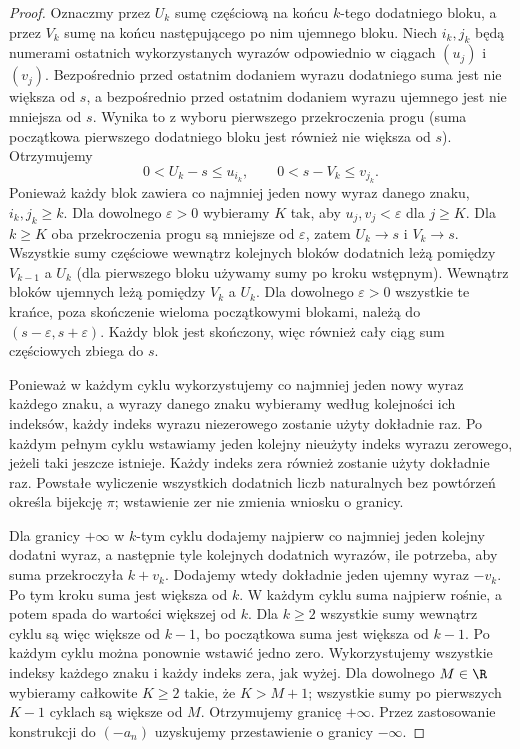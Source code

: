 \begin{proof}
Oznaczmy przez $U_k$ sumę częściową na końcu $k$-tego dodatniego bloku, a przez $V_k$ sumę na końcu następującego po nim ujemnego bloku. Niech $i_k,j_k$ będą numerami ostatnich wykorzystanych wyrazów odpowiednio w ciągach $(u_j)$ i $(v_j)$. Bezpośrednio przed ostatnim dodaniem wyrazu dodatniego suma jest nie większa od $s$, a bezpośrednio przed ostatnim dodaniem wyrazu ujemnego jest nie mniejsza od $s$. Wynika to z wyboru pierwszego przekroczenia progu (suma początkowa pierwszego dodatniego bloku jest również nie większa od $s$). Otrzymujemy
\[
 0<U_k-s\le u_{i_k},\qquad 0<s-V_k\le v_{j_k}.
\]
Ponieważ każdy blok zawiera co najmniej jeden nowy wyraz danego znaku, $i_k,j_k\ge k$. Dla dowolnego $\varepsilon>0$ wybieramy $K$ tak, aby $u_j,v_j<\varepsilon$ dla $j\ge K$. Dla $k\ge K$ oba przekroczenia progu są mniejsze od $\varepsilon$, zatem $U_k\to s$ i $V_k\to s$. Wszystkie sumy częściowe wewnątrz kolejnych bloków dodatnich leżą pomiędzy $V_{k-1}$ a $U_k$ (dla pierwszego bloku używamy sumy po kroku wstępnym). Wewnątrz bloków ujemnych leżą pomiędzy $V_k$ a $U_k$. Dla dowolnego $\varepsilon>0$ wszystkie te krańce, poza skończenie wieloma początkowymi blokami, należą do $(s-\varepsilon,s+\varepsilon)$. Każdy blok jest skończony, więc również cały ciąg sum częściowych zbiega do $s$.

Ponieważ w każdym cyklu wykorzystujemy co najmniej jeden nowy wyraz każdego znaku, a wyrazy danego znaku wybieramy według kolejności ich indeksów, każdy indeks wyrazu niezerowego zostanie użyty dokładnie raz. Po każdym pełnym cyklu wstawiamy jeden kolejny nieużyty indeks wyrazu zerowego, jeżeli taki jeszcze istnieje. Każdy indeks zera również zostanie użyty dokładnie raz. Powstałe wyliczenie wszystkich dodatnich liczb naturalnych bez powtórzeń określa bijekcję $\pi$; wstawienie zer nie zmienia wniosku o granicy.

Dla granicy $+\infty$ w $k$-tym cyklu dodajemy najpierw co najmniej jeden kolejny dodatni wyraz, a następnie tyle kolejnych dodatnich wyrazów, ile potrzeba, aby suma przekroczyła $k+v_k$. Dodajemy wtedy dokładnie jeden ujemny wyraz $-v_k$. Po tym kroku suma jest większa od $k$. W każdym cyklu suma najpierw rośnie, a potem spada do wartości większej od $k$. Dla $k\ge2$ wszystkie sumy wewnątrz cyklu są więc większe od $k-1$, bo początkowa suma jest większa od $k-1$. Po każdym cyklu można ponownie wstawić jedno zero. Wykorzystujemy wszystkie indeksy każdego znaku i każdy indeks zera, jak wyżej. Dla dowolnego $M\in\R$ wybieramy całkowite $K\ge2$ takie, że $K>M+1$; wszystkie sumy po pierwszych $K-1$ cyklach są większe od $M$. Otrzymujemy granicę $+\infty$. Przez zastosowanie konstrukcji do $(-a_n)$ uzyskujemy przestawienie o granicy $-\infty$.


\end{proof}
